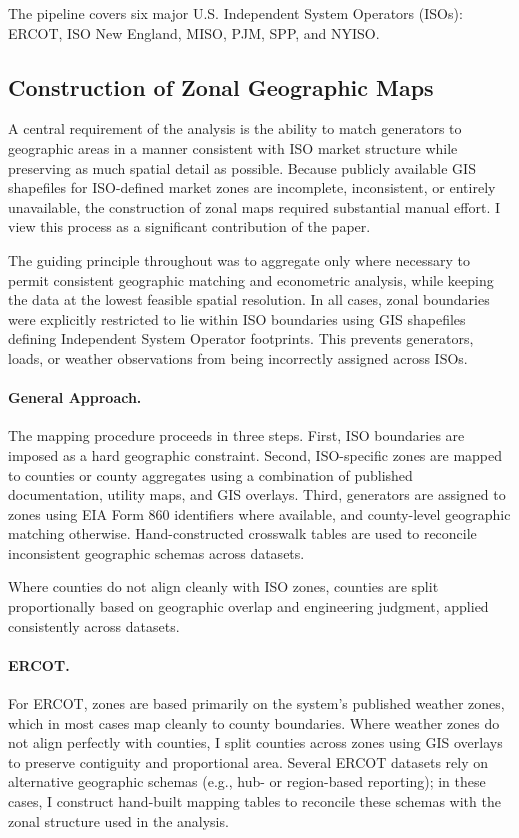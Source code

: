 \documentclass[12pt]{article}
\begin{document}
The pipeline covers six major U.S. Independent System Operators (ISOs): ERCOT, ISO New England, MISO, PJM, SPP, and NYISO.

\subsection{Construction of Zonal Geographic Maps}
\label{sec:appendix_zonal_maps}

A central requirement of the analysis is the ability to match generators to geographic areas in a manner consistent with ISO market structure while preserving as much spatial detail as possible. Because publicly available GIS shapefiles for ISO-defined market zones are incomplete, inconsistent, or entirely unavailable, the construction of zonal maps required substantial manual effort. I view this process as a significant contribution of the paper.

The guiding principle throughout was to aggregate only where necessary to permit consistent geographic matching and econometric analysis, while keeping the data at the lowest feasible spatial resolution. In all cases, zonal boundaries were explicitly restricted to lie within ISO boundaries using GIS shapefiles defining Independent System Operator footprints. This prevents generators, loads, or weather observations from being incorrectly assigned across ISOs.

\paragraph{General Approach.}
The mapping procedure proceeds in three steps. First, ISO boundaries are imposed as a hard geographic constraint. Second, ISO-specific zones are mapped to counties or county aggregates using a combination of published documentation, utility maps, and GIS overlays. Third, generators are assigned to zones using EIA Form 860 identifiers where available, and county-level geographic matching otherwise. Hand-constructed crosswalk tables are used to reconcile inconsistent geographic schemas across datasets.

Where counties do not align cleanly with ISO zones, counties are split proportionally based on geographic overlap and engineering judgment, applied consistently across datasets.

\paragraph{ERCOT.}
For ERCOT, zones are based primarily on the system’s published weather zones, which in most cases map cleanly to county boundaries. Where weather zones do not align perfectly with counties, I split counties across zones using GIS overlays to preserve contiguity and proportional area. Several ERCOT datasets rely on alternative geographic schemas (e.g., hub- or region-based reporting); in these cases, I construct hand-built mapping tables to reconcile these schemas with the zonal structure used in the analysis.
\end{document}
